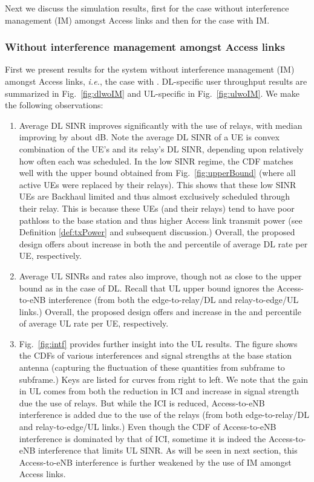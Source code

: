 \documentclass[journal]{IEEEtran}
\newcommand{\ie}{\emph{i.e.}}
\begin{document}
Next we discuss the simulation results, first for the case without interference management (IM) amongst Access links and then for the case with IM.



\subsubsection{Without interference management amongst Access links}
First we present results for the system without interference management (IM) amongst Access links, \ie, the case with .  DL-specific user throughput results are summarized in Fig.~\ref{fig:dlwoIM} and UL-specific in Fig.~\ref{fig:ulwoIM}.  We make the following observations:
\begin{enumerate}
  \item Average DL SINR improves significantly with the use of relays, with median improving by about dB.  Note the average DL SINR of a UE is convex combination of the UE's and its relay's DL SINR, depending upon relatively how often each was scheduled.  In the low SINR regime, the CDF matches well with the upper bound obtained from Fig.~\ref{fig:upperBound} (where all active UEs were replaced by their relays).  This shows that these low SINR UEs are Backhaul limited and thus almost exclusively scheduled through their relay. This is because these UEs (and their relays) tend to have poor pathloss to the base station and thus higher Access link transmit power (see Definition \ref{def:txPower} and subsequent discussion.)  Overall, the proposed design offers about  increase in both the  and  percentile of average DL rate per UE, respectively.
  \item Average UL SINRs and rates also improve, though not as close to the upper bound as in the case of DL. Recall that UL upper bound ignores the Access-to-eNB interference (from both the edge-to-relay/DL and relay-to-edge/UL links.)
Overall, the proposed design offers  and  increase in the  and  percentile of average UL rate per UE, respectively.
  \item Fig.~\ref{fig:intf} provides further insight into the UL results.  The figure shows the CDFs of various interferences and signal strengths at the base station antenna (capturing the fluctuation of these quantities from subframe to subframe.)  Keys are listed for curves from right to left.  We note that the gain in UL comes from both the reduction in ICI and increase in signal strength due the use of relays.  But while the ICI is reduced, Access-to-eNB interference is added due to the use of the relays (from both edge-to-relay/DL and relay-to-edge/UL links.)  Even though the CDF of Access-to-eNB interference is dominated by that of ICI, sometime it is indeed the Access-to-eNB interference that limits UL SINR.  As will be seen in next section, this Access-to-eNB interference is further weakened by the use of IM amongst Access links.

\end{enumerate}
\end{document}
